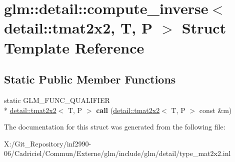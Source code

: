 \hypertarget{structglm_1_1detail_1_1compute__inverse_3_01detail_1_1tmat2x2_00_01_t_00_01_p_01_4}{\section{glm\-:\-:detail\-:\-:compute\-\_\-inverse$<$ detail\-:\-:tmat2x2, T, P $>$ Struct Template Reference}
\label{structglm_1_1detail_1_1compute__inverse_3_01detail_1_1tmat2x2_00_01_t_00_01_p_01_4}
}
\subsection*{Static Public Member Functions}
\begin{DoxyCompactItemize}
\item 
\hypertarget{structglm_1_1detail_1_1compute__inverse_3_01detail_1_1tmat2x2_00_01_t_00_01_p_01_4_ab9c06b142ec7941cda76021e09240f30}{static G\-L\-M\-\_\-\-F\-U\-N\-C\-\_\-\-Q\-U\-A\-L\-I\-F\-I\-E\-R \\*
\hyperlink{structglm_1_1detail_1_1tmat2x2}{detail\-::tmat2x2}$<$ T, P $>$ {\bfseries call} (\hyperlink{structglm_1_1detail_1_1tmat2x2}{detail\-::tmat2x2}$<$ T, P $>$ const \&m)}\label{structglm_1_1detail_1_1compute__inverse_3_01detail_1_1tmat2x2_00_01_t_00_01_p_01_4_ab9c06b142ec7941cda76021e09240f30}

\end{DoxyCompactItemize}


The documentation for this struct was generated from the following file\-:\begin{DoxyCompactItemize}
\item 
X\-:/\-Git\-\_\-\-Repository/inf2990-\/06/\-Cadriciel/\-Commun/\-Externe/glm/include/glm/detail/type\-\_\-mat2x2.\-inl\end{DoxyCompactItemize}
